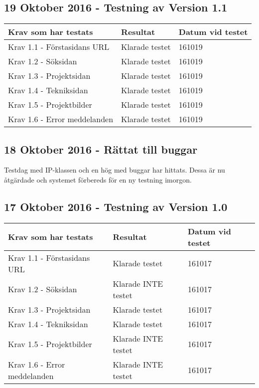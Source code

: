 \documentclass{TDP003mall}
\begin{document}
    \subsection*{19 Oktober 2016 - Testning av Version 1.1}
    \begin{table}[!h]
    \begin{tabularx}{\linewidth}{|l|X|l|}
    \hline
    Krav som har testats & Resultat & Datum vid testet \\\hline
    Krav 1.1 - Förstasidans URL & Klarade testet & 161019 \\\hline
    Krav 1.2 - Söksidan & Klarade testet & 161019 \\\hline
    Krav 1.3 - Projektsidan & Klarade testet & 161019 \\\hline
    Krav 1.4 - Tekniksidan & Klarade testet & 161019 \\\hline
    Krav 1.5 - Projektbilder & Klarade testet & 161019 \\\hline
    Krav 1.6 - Error meddelanden & Klarade testet & 161019 \\\hline
    \end{tabularx}
    \end{table}
    
    \subsection*{18 Oktober 2016 - Rättat till buggar}
    Testdag med IP-klassen och en hög med buggar har hittats. Dessa är nu åtgärdade och systemet förbereds för en ny testning imorgon.

    \subsection*{17 Oktober 2016 - Testning av Version 1.0}
    \begin{table}[!h]
    \begin{tabularx}{\linewidth}{|l|X|l|}
    \hline
    Krav som har testats & Resultat & Datum vid testet \\\hline
    Krav 1.1 - Förstasidans URL & Klarade testet & 161017 \\\hline
    Krav 1.2 - Söksidan & Klarade INTE testet & 161017 \\\hline
    Krav 1.3 - Projektsidan & Klarade testet & 161017 \\\hline
    Krav 1.4 - Tekniksidan & Klarade testet & 161017 \\\hline
    Krav 1.5 - Projektbilder & Klarade INTE testet & 161017 \\\hline
    Krav 1.6 - Error meddelanden & Klarade INTE testet & 161017 \\\hline
    \end{tabularx}
    \end{table}
    
\end{document}
